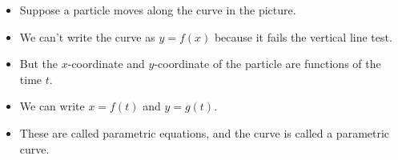 \begin{frame}
\begin{columns}[c]
{}%
%
%
\begin{itemize}
\item  Suppose a particle moves along the curve in the picture.
\item<6->  We can't write the curve as $y = f(x)$ because it fails the vertical line test.
\item<7->  But the $x$-coordinate and $y$-coordinate of the particle are functions of the time $t$.
\item<8->  We can write $x = f(t)$ and $y = g(t)$.
\item<9->  These are called parametric equations, and the curve is called a parametric curve.
\end{itemize}
\end{columns}
\end{frame}
